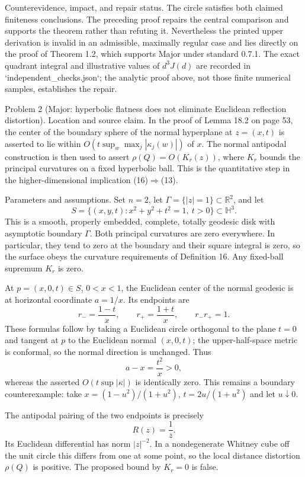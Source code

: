 \documentclass[10pt]{article}
\begin{document}
Counterevidence, impact, and repair status. The circle satisfies both claimed finiteness conclusions. The preceding proof repairs the central comparison and supports the theorem rather than refuting it. Nevertheless the printed upper derivation is invalid in an admissible, maximally regular case and lies directly on the proof of Theorem 1.2, which supports Major under standard 0.7.1. The exact quadrant integral and illustrative values of \(d^3J(d)\) are recorded in `independent\_checks.json`; the analytic proof above, not those finite numerical samples, establishes the repair.\par
Problem 2 (Major: hyperbolic flatness does not eliminate Euclidean reflection distortion).  Location and source claim. In the proof of Lemma 18.2 on page 53, the center of the boundary sphere of the normal hyperplane at \(z=(x,t)\) is asserted to lie within \(O(t\sup_w\max_j|\kappa_j(w)|)\) of \(x\). The normal antipodal construction is then used to assert \(\rho(Q)=O(K_r(z))\), where \(K_r\) bounds the principal curvatures on a fixed hyperbolic ball. This is the quantitative step in the higher-dimensional implication (16)\(\Rightarrow\)(13).\par
Parameters and assumptions. Set \(n=2\), let \(\Gamma=\{|z|=1\}\subset\mathbb R^2\), and let \[S=\{(x,y,t):x^2+y^2+t^2=1,\ t>0\}\subset\mathbb H^3.\] This is a smooth, properly embedded, complete, totally geodesic disk with asymptotic boundary \(\Gamma\). Both principal curvatures are zero everywhere. In particular, they tend to zero at the boundary and their square integral is zero, so the surface obeys the curvature requirements of Definition 16. Any fixed-ball supremum \(K_r\) is zero.\par
At \(p=(x,0,t)\in S\), \(0<x<1\), the Euclidean center of the normal geodesic is at horizontal coordinate \(a=1/x\). Its endpoints are \[r_-=\frac{1-t}{x},\qquad r_+=\frac{1+t}{x},
 \qquad r_-r_+=1.\] These formulas follow by taking a Euclidean circle orthogonal to the plane \(t=0\) and tangent at \(p\) to the Euclidean normal \((x,0,t)\); the upper-half-space metric is conformal, so the normal direction is unchanged. Thus \[a-x=\frac{t^2}{x}>0,\] whereas the asserted \(O(t\sup|\kappa|)\) is identically zero. This remains a boundary counterexample: take \(x=(1-u^2)/(1+u^2)\), \(t=2u/(1+u^2)\) and let \(u\downarrow0\).\par
The antipodal pairing of the two endpoints is precisely \[R(z)=\frac1{\overline z}.\] Its Euclidean differential has norm \(|z|^{-2}\). In a nondegenerate Whitney cube off the unit circle this differs from one at some point, so the local distance distortion \(\rho(Q)\) is positive. The proposed bound by \(K_r=0\) is false.\par
\end{document}
